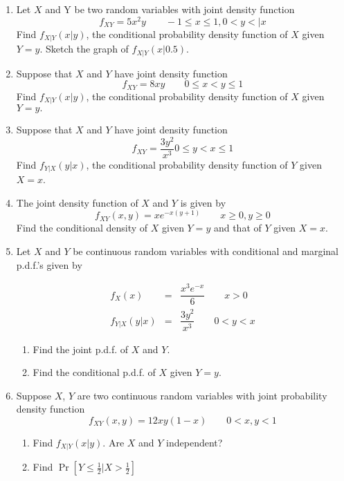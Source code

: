 \documentclass[../main.tex]{subfiles}
\begin{document}
\begin{exercises}
\begin{enumerate}
\item %
Let $X$ and Y be two random variables with joint density function
$$f_{XY}=5x^2y \qquad -1 \leq x \leq 1, 0 < y < |x$$
Find $f_{X|Y}(x|y)$, the conditional probability density function of $X$ given $Y =
y.$ Sketch the graph of $f_{X|Y}(x|0.5).$



\item %
Suppose that $X$ and $Y$ have joint density function
$$f_{XY} = 8xy \qquad 0 \leq x < y \leq 1$$
Find $f_{X|Y}(x|y)$, the conditional probability density function of $X$ given $Y =
y.$



\item %
Suppose that $X$ and $Y$ have joint density function
$$f_{XY}=\dfrac{3y^2}{x^3} 0 \leq y <x \leq 1$$
Find $f_{Y|X}(y|x)$, the conditional probability density function of $Y$ given $X=x$.

\item %
The joint density function of $X$ and $Y$ is given by
$$f_{XY}(x,y) = xe^{-x(y+1)}\qquad x \geq 0, y \geq 0$$
Find the conditional density of $X$ given $Y = y$ and that of $Y$ given $X = x$.



\item %
Let $X$ and $Y$ be continuous random variables with conditional and marginal
p.d.f.’s given by

\begin{eqnarray*}
  f_X(x) &=& \dfrac{x^3e^{-x}}{6} \qquad x>0 \\
  f_{Y|X}(y|x) &=& \dfrac{3y^2}{x^3} \qquad 0<y<x
\end{eqnarray*}

\begin{enumerate}
  \setlength\itemsep{-0.5ex}
  \item Find the joint p.d.f. of $X$ and $Y$.
  \item Find the conditional p.d.f. of $X$ given $Y = y$.
\end{enumerate}


\item %
Suppose $X$, $Y$ are two continuous random variables with joint probability
density function
$$f_{XY}(x,y) = 12xy(1-x) \qquad 0<x,y<1$$
\begin{enumerate}
\item Find $f_{X|Y}(x|y)$. Are $X$ and $Y$ independent?
\item Find $\Pr[Y \leq \frac12 | X > \frac12]$
\end{enumerate}



\end{enumerate}
\end{exercises}
\end{document}

